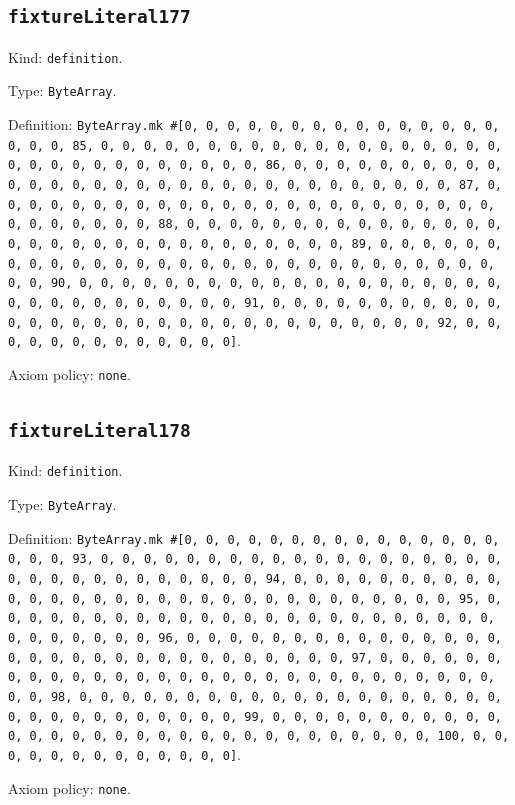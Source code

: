 \documentclass[11pt]{article}
\begin{document}
\subsection*{\texttt{fixtureLiteral177}}
\noindent Kind: \texttt{definition}.\par
\noindent Type: \texttt{ByteArray}.\par
\noindent Definition: \texttt{ByteArray.mk \#[0, 0, 0, 0, 0, 0, 0, 0, 0, 0, 0, 0, 0, 0, 0, 0, 0, 0, 85, 0, 0, 0, 0, 0, 0, 0, 0, 0, 0, 0, 0, 0, 0, 0, 0, 0, 0, 0, 0, 0, 0, 0, 0, 0, 0, 0, 0, 0, 0, 0, 86, 0, 0, 0, 0, 0, 0, 0, 0, 0, 0, 0, 0, 0, 0, 0, 0, 0, 0, 0, 0, 0, 0, 0, 0, 0, 0, 0, 0, 0, 0, 0, 87, 0, 0, 0, 0, 0, 0, 0, 0, 0, 0, 0, 0, 0, 0, 0, 0, 0, 0, 0, 0, 0, 0, 0, 0, 0, 0, 0, 0, 0, 0, 0, 88, 0, 0, 0, 0, 0, 0, 0, 0, 0, 0, 0, 0, 0, 0, 0, 0, 0, 0, 0, 0, 0, 0, 0, 0, 0, 0, 0, 0, 0, 0, 0, 89, 0, 0, 0, 0, 0, 0, 0, 0, 0, 0, 0, 0, 0, 0, 0, 0, 0, 0, 0, 0, 0, 0, 0, 0, 0, 0, 0, 0, 0, 0, 0, 90, 0, 0, 0, 0, 0, 0, 0, 0, 0, 0, 0, 0, 0, 0, 0, 0, 0, 0, 0, 0, 0, 0, 0, 0, 0, 0, 0, 0, 0, 0, 0, 91, 0, 0, 0, 0, 0, 0, 0, 0, 0, 0, 0, 0, 0, 0, 0, 0, 0, 0, 0, 0, 0, 0, 0, 0, 0, 0, 0, 0, 0, 0, 0, 92, 0, 0, 0, 0, 0, 0, 0, 0, 0, 0, 0, 0, 0]}.\par
\noindent Axiom policy: \texttt{none}.\par
\subsection*{\texttt{fixtureLiteral178}}
\noindent Kind: \texttt{definition}.\par
\noindent Type: \texttt{ByteArray}.\par
\noindent Definition: \texttt{ByteArray.mk \#[0, 0, 0, 0, 0, 0, 0, 0, 0, 0, 0, 0, 0, 0, 0, 0, 0, 0, 93, 0, 0, 0, 0, 0, 0, 0, 0, 0, 0, 0, 0, 0, 0, 0, 0, 0, 0, 0, 0, 0, 0, 0, 0, 0, 0, 0, 0, 0, 0, 0, 94, 0, 0, 0, 0, 0, 0, 0, 0, 0, 0, 0, 0, 0, 0, 0, 0, 0, 0, 0, 0, 0, 0, 0, 0, 0, 0, 0, 0, 0, 0, 0, 95, 0, 0, 0, 0, 0, 0, 0, 0, 0, 0, 0, 0, 0, 0, 0, 0, 0, 0, 0, 0, 0, 0, 0, 0, 0, 0, 0, 0, 0, 0, 0, 96, 0, 0, 0, 0, 0, 0, 0, 0, 0, 0, 0, 0, 0, 0, 0, 0, 0, 0, 0, 0, 0, 0, 0, 0, 0, 0, 0, 0, 0, 0, 0, 97, 0, 0, 0, 0, 0, 0, 0, 0, 0, 0, 0, 0, 0, 0, 0, 0, 0, 0, 0, 0, 0, 0, 0, 0, 0, 0, 0, 0, 0, 0, 0, 98, 0, 0, 0, 0, 0, 0, 0, 0, 0, 0, 0, 0, 0, 0, 0, 0, 0, 0, 0, 0, 0, 0, 0, 0, 0, 0, 0, 0, 0, 0, 0, 99, 0, 0, 0, 0, 0, 0, 0, 0, 0, 0, 0, 0, 0, 0, 0, 0, 0, 0, 0, 0, 0, 0, 0, 0, 0, 0, 0, 0, 0, 0, 0, 100, 0, 0, 0, 0, 0, 0, 0, 0, 0, 0, 0, 0, 0]}.\par
\noindent Axiom policy: \texttt{none}.\par
\end{document}
